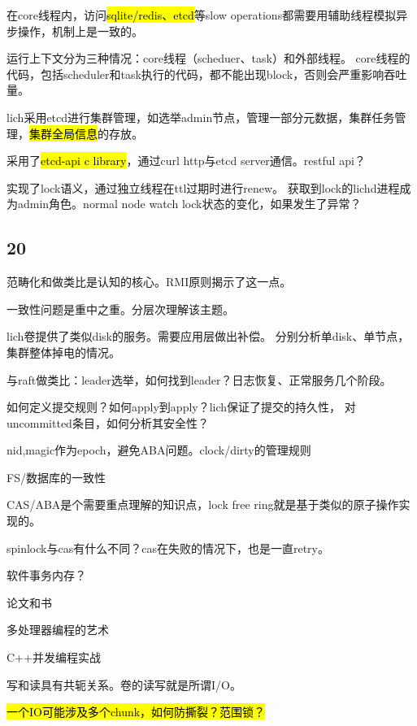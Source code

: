 在core线程内，访问\hl{sqlite/redis、etcd}等slow operations都需要用辅助线程模拟异步操作，机制上是一致的。

运行上下文分为三种情况：core线程（scheduer、task）和外部线程。
core线程的代码，包括scheduler和task执行的代码，都不能出现block，否则会严重影响吞吐量。

lich采用etcd进行集群管理，如选举admin节点，管理一部分元数据，集群任务管理，\hl{集群全局信息}的存放。

采用了\hl{etcd-api c library}，通过curl http与etcd server通信。restful api？

实现了lock语义，通过独立线程在ttl过期时进行renew。
获取到lock的lichd进程成为admin角色。normal node watch lock状态的变化，如果发生了异常？

\subsection{20}

\hrulefill

范畴化和做类比是认知的核心。RMI原则揭示了这一点。

一致性问题是重中之重。分层次理解该主题。

lich卷提供了类似disk的服务。需要应用层做出补偿。
分别分析单disk、单节点，集群整体掉电的情况。

与raft做类比：leader选举，如何找到leader？日志恢复、正常服务几个阶段。

如何定义提交规则？如何apply到apply？lich保证了提交的持久性，
对uncommitted条目，如何分析其安全性？

nid,magic作为epoch，避免ABA问题。clock/dirty的管理规则

FS/数据库的一致性

\hrulefill

CAS/ABA是个需要重点理解的知识点，lock free ring就是基于类似的原子操作实现的。

spinlock与cas有什么不同？cas在失败的情况下，也是一直retry。

软件事务内存？

论文和书
\begin{enumbox}
\item 多处理器编程的艺术
\item C++并发编程实战
\end{enumbox}

\hrulefill

写和读具有共轭关系。卷的读写就是所谓I/O。

\hl{一个IO可能涉及多个chunk，如何防撕裂？范围锁？}

